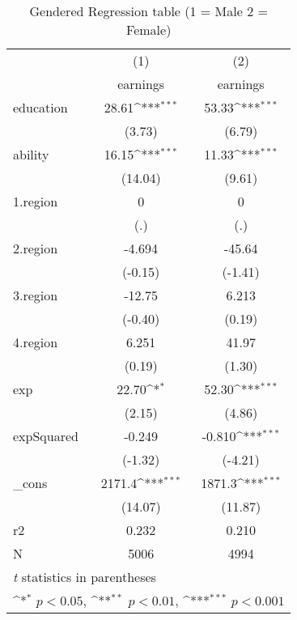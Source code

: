 \begin{table}[htbp]\centering
\def\sym#1{\ifmmode^{#1}\else\(^{#1}\)\fi}
\caption{Gendered Regression table (1 = Male 2 = Female)\label{tab1}}
\begin{tabular}{l*{2}{c}}
\hline\hline
            &\multicolumn{1}{c}{(1)}&\multicolumn{1}{c}{(2)}\\
            &\multicolumn{1}{c}{earnings}&\multicolumn{1}{c}{earnings}\\
\hline
education   &       28.61\sym{***}&       53.33\sym{***}\\
            &      (3.73)         &      (6.79)         \\
[1em]
ability     &       16.15\sym{***}&       11.33\sym{***}\\
            &     (14.04)         &      (9.61)         \\
[1em]
1.region    &           0         &           0         \\
            &         (.)         &         (.)         \\
[1em]
2.region    &      -4.694         &      -45.64         \\
            &     (-0.15)         &     (-1.41)         \\
[1em]
3.region    &      -12.75         &       6.213         \\
            &     (-0.40)         &      (0.19)         \\
[1em]
4.region    &       6.251         &       41.97         \\
            &      (0.19)         &      (1.30)         \\
[1em]
exp         &       22.70\sym{*}  &       52.30\sym{***}\\
            &      (2.15)         &      (4.86)         \\
[1em]
expSquared  &      -0.249         &      -0.810\sym{***}\\
            &     (-1.32)         &     (-4.21)         \\
[1em]
\_cons      &      2171.4\sym{***}&      1871.3\sym{***}\\
            &     (14.07)         &     (11.87)         \\
\hline
r2          &       0.232         &       0.210         \\
N           &        5006         &        4994         \\
\hline\hline
\multicolumn{3}{l}{\footnotesize \textit{t} statistics in parentheses}\\
\multicolumn{3}{l}{\footnotesize \sym{*} \(p<0.05\), \sym{**} \(p<0.01\), \sym{***} \(p<0.001\)}\\
\end{tabular}
\end{table}
